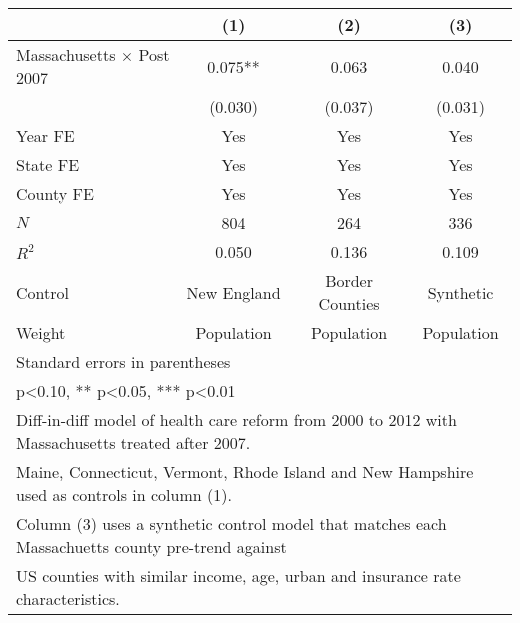 {
\def\sym#1{\ifmmode^{#1}\else\(^{#1}\)\fi}
\begin{tabular}{l*{3}{c}}
\hline\hline
          &\multicolumn{1}{c}{(1)}&\multicolumn{1}{c}{(2)}&\multicolumn{1}{c}{(3)}\\
\hline
Massachusetts $\times$ Post 2007&    0.075** &    0.063   &    0.040   \\
          &  (0.030)   &  (0.037)   &  (0.031)   \\
[1em]
Year FE   &      Yes   &      Yes   &      Yes   \\
[1em]
State FE  &      Yes   &      Yes   &      Yes   \\
[1em]
County FE &      Yes   &      Yes   &      Yes   \\
\hline
\(N\)     &      804   &      264   &      336   \\
\(R^{2}\) &    0.050   &    0.136   &    0.109   \\
Control   &New England   &Border Counties   &Synthetic   \\
Weight    &Population   &Population   &Population   \\
\hline\hline
\multicolumn{4}{l}{\footnotesize Standard errors in parentheses}\\
\multicolumn{4}{l}{\footnotesize * p<0.10, ** p<0.05, *** p<0.01}\\
\multicolumn{4}{l}{\footnotesize Diff-in-diff model of health care reform from 2000 to 2012 with Massachusetts treated after 2007. }\\
\multicolumn{4}{l}{\footnotesize Maine, Connecticut, Vermont, Rhode Island and New Hampshire used as controls in column (1). }\\
\multicolumn{4}{l}{\footnotesize Column (3) uses a synthetic control model that matches each Massachuetts county pre-trend against}\\
\multicolumn{4}{l}{\footnotesize \space US counties with similar income, age, urban and insurance rate characteristics. }\\
\end{tabular}
}
